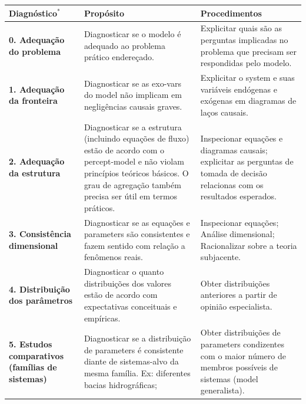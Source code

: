 \documentclass[./main.tex]{subfiles}
\begin{document}
{\renewcommand{\arraystretch}{1.5}%
\begin{table}[t!]
    \centering	
    \tiny
    \sffamily
    \begin{tabular}{ 
 >{\raggedright\arraybackslash}m{2.75cm}  
 >{\raggedright\arraybackslash}m{5cm}  
 >{\raggedright\arraybackslash}m{5cm}}
        \toprule
        \textbf{Diagnóstico}$^*$& \textbf{Propósito}& \textbf{Procedimentos}\\ 
        \midrule

        \textbf{0. Adequação do problema} & Diagnosticar se o modelo é adequado ao problema prático endereçado. & Explicitar quais são as perguntas implicadas no problema que precisam ser respondidas pelo modelo.\\
        
        \textbf{1. Adequação da fronteira} & Diagnosticar se as \gls{exo-vars} do \gls{model} não implicam em negligências causais graves.& Explicitar o \gls{system} e suas variáveis endógenas e exógenas em diagramas de laços causais.\\         
        
        \textbf{2. Adequação da estrutura} & Diagnosticar se a estrutura (incluindo equações de fluxo) estão de acordo com o \gls{percept-model} e não violam princípios teóricos básicos. O grau de agregação também precisa ser útil em termos práticos.& 
        Inspecionar equações e diagramas causais; explicitar as perguntas de tomada de decisão relacionas com os resultados esperados.\\        
        
        \textbf{3. Consistência dimensional} & Diagnosticar se as equações e \gls{parameters} são consistentes e fazem sentido com relação a fenômenos reais.& 
        Inspecionar equações; Análise dimensional; Racionalizar sobre a \gls{teoria} subjacente.\\ 
        
        \textbf{4. Distribuição dos parâmetros} & Diagnosticar o quanto distribuições dos valores estão de acordo com expectativas conceituais e empíricas.& Obter distribuições anteriores a partir de opinião especialista.\\        
        
        \textbf{5. Estudos comparativos (famílias de sistemas)} & Diagnosticar se a distribuição de \gls{parameters} é consistente diante de sistemas-alvo da mesma família. Ex: diferentes bacias hidrográficas;& Obter distribuições de \gls{parameters} condizentes com o maior número de membros possíveis de sistemas (\gls{model} generalista).\\        
        

\end{tabular}
\end{table}}
\end{document}
